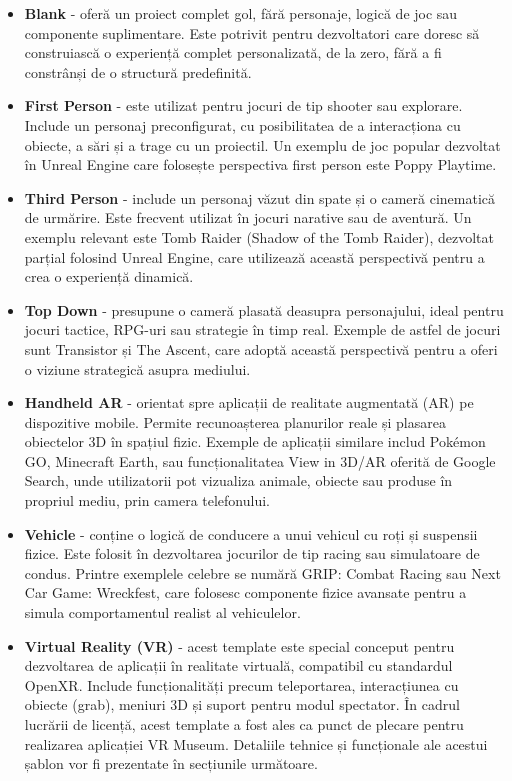 \begin{itemize}
\item \textbf{Blank} - oferă un proiect complet gol, fără personaje, logică de joc sau componente suplimentare. Este potrivit pentru dezvoltatori care doresc să construiască o experiență complet personalizată, de la zero, fără a fi constrânși de o structură predefinită.
\item \textbf{First Person} - este utilizat pentru jocuri de tip shooter sau explorare. Include un personaj preconfigurat, cu posibilitatea de a interacționa cu obiecte, a sări și a trage cu un proiectil. Un exemplu de joc popular dezvoltat în Unreal Engine care folosește perspectiva first person este Poppy Playtime.
\item \textbf{Third Person} - include un personaj văzut din spate și o cameră cinematică de urmărire. Este frecvent utilizat în jocuri narative sau de aventură. Un exemplu relevant este Tomb Raider (Shadow of the Tomb Raider), dezvoltat parțial folosind Unreal Engine, care utilizează această perspectivă pentru a crea o experiență dinamică.
\item \textbf{Top Down} - presupune o cameră plasată deasupra personajului, ideal pentru jocuri tactice, RPG-uri sau strategie în timp real. Exemple de astfel de jocuri sunt Transistor și The Ascent, care adoptă această perspectivă pentru a oferi o viziune strategică asupra mediului.
\item \textbf{Handheld AR} - orientat spre aplicații de realitate augmentată (AR) pe dispozitive mobile. Permite recunoașterea planurilor reale și plasarea obiectelor 3D în spațiul fizic. Exemple de aplicații similare includ Pokémon GO, Minecraft Earth, sau funcționalitatea View in 3D/AR oferită de Google Search, unde utilizatorii pot vizualiza animale, obiecte sau produse în propriul mediu, prin camera telefonului.
\item \textbf{Vehicle} - conține o logică de conducere a unui vehicul cu roți și suspensii fizice. Este folosit în dezvoltarea jocurilor de tip racing sau simulatoare de condus. Printre exemplele celebre se numără GRIP: Combat Racing sau Next Car Game: Wreckfest, care folosesc componente fizice avansate pentru a simula comportamentul realist al vehiculelor.
\item \textbf{Virtual Reality (VR)} - acest template este special conceput pentru dezvoltarea de aplicații în realitate virtuală, compatibil cu standardul OpenXR. Include funcționalități precum teleportarea, interacțiunea cu obiecte (grab), meniuri 3D și suport pentru modul spectator. În cadrul lucrării de licență, acest template a fost ales ca punct de plecare pentru realizarea aplicației VR Museum. Detaliile tehnice și funcționale ale acestui șablon vor fi prezentate în secțiunile următoare.

\end{itemize}

